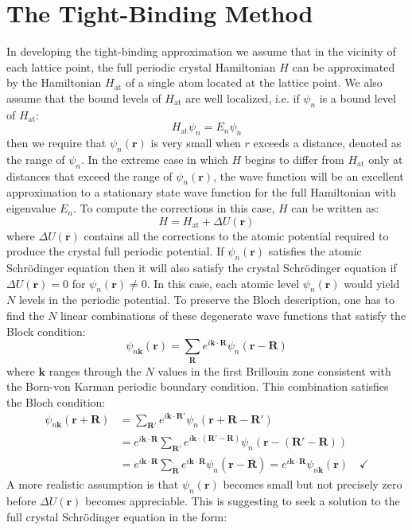\documentclass[10.75pt,a4paper,openright,bottom=2cm]{article}
\renewcommand{\Vec}[1]{\boldsymbol{#1}}
\begin{document}
\section{The Tight-Binding Method}
In developing the tight-binding approximation we assume that in the vicinity of each lattice point, the full periodic crystal Hamiltonian $H$ can be approximated by the Hamiltonian $H_{\text{at}}$ of a single atom located at the lattice point. We also assume that the bound levels of $H_{\text{at}}$ are well localized, i.e. if $\psi_n$ is a bound level of $H_{\text{at}}$:
\[
H_{\text{at}}\psi_n=E_n\psi_n
\]
then we require that $\psi_n(\Vec{r})$ is very small when $r$ exceeds a distance, denoted as the range of $\psi_n$. In the extreme case in which $H$ begins to differ from $H_{\text{at}}$ only at distances that exceed the range of $\psi_n(\Vec{r})$, the wave function will be an excellent approximation to a stationary state wave function for the full Hamiltonian with eigenvalue $E_n$. To compute the corrections in this case, $H$ can be written as:
\[
H=H_{\text{at}}+\Delta U(\Vec{r})
\]
where $\Delta U(\Vec{r})$ contains all the corrections to the atomic potential required to produce the crystal full periodic potential. If $\psi_n(\Vec{r})$ satisfies the atomic Schr\"odinger equation then it will also satisfy the crystal Schr\"odinger equation if $\Delta U(\Vec{r})=0$ for $\psi_n(\Vec{r})\neq0$. In this case, each atomic level $\psi_n(\Vec{r})$ would yield $N$ levels in the periodic potential. To preserve the Bloch description, one has to find the $N$ linear combinations of these degenerate wave functions that satisfy the Block condition:
\[
\psi_{n\Vec{k}}(\Vec{r})=\sum_{\Vec{R}}e^{i\Vec{k}\cdot\Vec{R}}\psi_n(\Vec{r}-\Vec{R})
\]
where $\Vec{k}$ ranges through the $N$ values in the first Brillouin zone consistent with the Born-von Karman periodic boundary condition. This combination satisfies the Bloch condition:
\begin{align*}
\psi_{n\Vec{k}}(\Vec{r}+\Vec{R})&=\sum_{\Vec{R'}}e^{i\Vec{k}\cdot\Vec{R'}}\psi_n(\Vec{r}+\Vec{R}-\Vec{R'})\\
&=e^{i\Vec{k}\cdot\Vec{R}}\sum_{\Vec{R'}}e^{i\Vec{k}\cdot(\Vec{R'}-\Vec{R})}\psi_n(\Vec{r}-(\Vec{R'}-\Vec{R}))\\
&=e^{i\Vec{k}\cdot\Vec{R}}\sum_{\Vec{\overline{R}}}e^{i\Vec{k}\cdot\Vec{\overline{R}}}\psi_n(\Vec{r}-\Vec{\overline{R}})=e^{i\Vec{k}\cdot\Vec{R}}\psi_{n\Vec{k}}(\Vec{r}) \quad \checkmark
\end{align*}
A more realistic assumption is that $\psi_n(\Vec{r})$ becomes small but not precisely zero before $\Delta U(\Vec{r})$ becomes appreciable. This is suggesting to seek a solution to the full crystal Schr\"odinger equation in the form:
\end{document}
